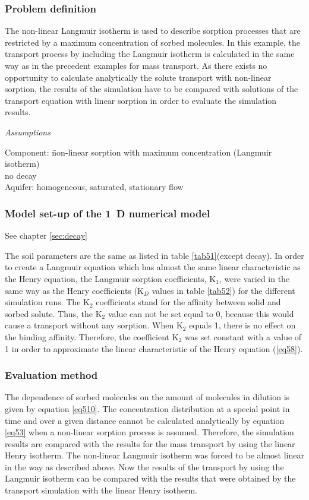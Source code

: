 \subsubsection*{Problem definition}

The non-linear Langmuir isotherm is used to describe sorption processes that are restricted by a maximum concentration of sorbed molecules. In this example, the transport process by including the Langmuir isotherm is calculated in the same way as in the precedent examples for mass transport. As there exists no opportunity to calculate analytically the solute transport with non-linear sorption, the results of the simulation have to be compared with solutions of the transport equation with linear sorption in order to evaluate the simulation results.

\textsl{Assumptions}

\begin{tabbing}
Component: \= non-linear sorption with maximum concentration (Langmuir isotherm)\\
\> no decay \\
Aquifer: \> homogeneous, saturated, stationary flow \\
\end{tabbing}

\subsubsection*{Model set-up of the 1~D numerical model}

See chapter \ref{sec:decay}

The soil parameters are the same as listed in table \ref{tab51}(except decay). In order to create a Langmuir equation which has almost the same linear characteristic as the Henry equation, the Langmuir sorption coefficients, K$_1$, were varied in the same way as the Henry coefficients (K$_D$ values in table \ref{tab52}) for the different simulation runs. The K$_2$ coefficients stand for the affinity between solid and sorbed solute. Thus, the K$_2$ value can not be set equal to 0, because this would cause a transport without any sorption. When K$_2$ equals 1, there is no effect on the binding affinity. Therefore, the coefficient K$_2$ was set constant with a value of 1 in order to approximate the linear characteristic of the Henry equation (\ref{eq58}).

\subsubsection*{Evaluation method}
The dependence of sorbed molecules on the amount of molecules in dilution is given by equation \ref{eq510}. The concentration distribution at a special point in time and over a given distance cannot be calculated analytically by equation \ref{eq53} when a non-linear sorption process is assumed. Therefore, the simulation results are compared with the results for the mass transport by using the linear Henry isotherm. The non-linear Langmuir isotherm was forced to be almost linear in the way as described above. Now the results of the transport by using the Langmuir isotherm can be compared with the results that were obtained by the transport simulation with the linear Henry isotherm.

